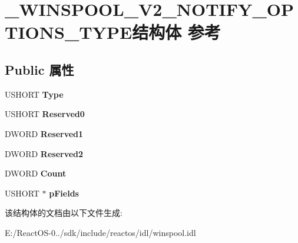 \hypertarget{struct___w_i_n_s_p_o_o_l___v2___n_o_t_i_f_y___o_p_t_i_o_n_s___t_y_p_e}{}\section{\+\_\+\+W\+I\+N\+S\+P\+O\+O\+L\+\_\+\+V2\+\_\+\+N\+O\+T\+I\+F\+Y\+\_\+\+O\+P\+T\+I\+O\+N\+S\+\_\+\+T\+Y\+P\+E结构体 参考}
\label{struct___w_i_n_s_p_o_o_l___v2___n_o_t_i_f_y___o_p_t_i_o_n_s___t_y_p_e}
\subsection*{Public 属性}
\begin{DoxyCompactItemize}
\item 
\mbox{\label{struct___w_i_n_s_p_o_o_l___v2___n_o_t_i_f_y___o_p_t_i_o_n_s___t_y_p_e_a22e76c796b32b9fbd600b4a5c7da78bc}} 
U\+S\+H\+O\+RT {\bfseries Type}
\item 
\mbox{\label{struct___w_i_n_s_p_o_o_l___v2___n_o_t_i_f_y___o_p_t_i_o_n_s___t_y_p_e_a831b0d9568ebd03ab6a23ab8e321943c}} 
U\+S\+H\+O\+RT {\bfseries Reserved0}
\item 
\mbox{\label{struct___w_i_n_s_p_o_o_l___v2___n_o_t_i_f_y___o_p_t_i_o_n_s___t_y_p_e_a996685c50843c5351f5098298f1cf378}} 
D\+W\+O\+RD {\bfseries Reserved1}
\item 
\mbox{\label{struct___w_i_n_s_p_o_o_l___v2___n_o_t_i_f_y___o_p_t_i_o_n_s___t_y_p_e_a5b0dcd04a71970040b9a6dba240e1efe}} 
D\+W\+O\+RD {\bfseries Reserved2}
\item 
\mbox{\label{struct___w_i_n_s_p_o_o_l___v2___n_o_t_i_f_y___o_p_t_i_o_n_s___t_y_p_e_a0e4e658e2b4dcfe792db19b86a4c00c1}} 
D\+W\+O\+RD {\bfseries Count}
\item 
\mbox{\label{struct___w_i_n_s_p_o_o_l___v2___n_o_t_i_f_y___o_p_t_i_o_n_s___t_y_p_e_a9b850f68f0ceb795697122dbab4790ce}} 
U\+S\+H\+O\+RT $\ast$ {\bfseries p\+Fields}
\end{DoxyCompactItemize}


该结构体的文档由以下文件生成\+:\begin{DoxyCompactItemize}
\item 
E\+:/\+React\+O\+S-\/0../sdk/include/reactos/idl/winspool.\+idl\end{DoxyCompactItemize}
